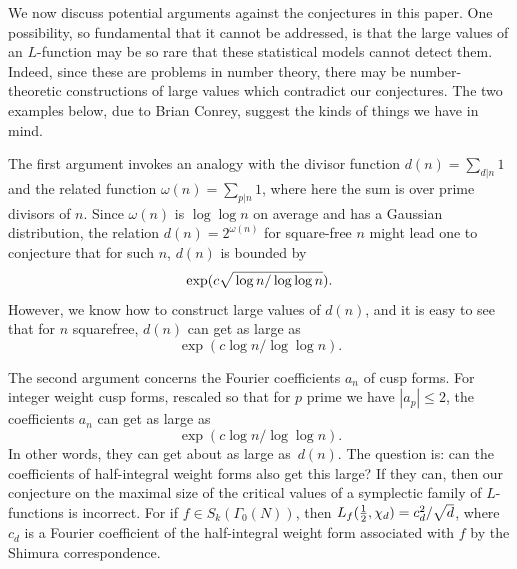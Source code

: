 \documentclass[10pt,reqno,twoside]{amsart}
\numberwithin{equation}{section}
\numberwithin{theorem}{section}
\begin{document}
{{We now discuss  potential arguments against the conjectures
in this paper. One possibility,  so fundamental that
it cannot be addressed, is that the
large values of an $L$-function may be so rare that
these statistical models cannot detect them. Indeed, since these are
problems in number theory, there may be number-theoretic
constructions of large values which contradict our conjectures.
The two examples below,  due to Brian Conrey, suggest the kinds
of things we have in mind.


The first argument invokes an
analogy with the divisor function $d(n)=\sum_{d|n} 1$ and the
related function $\omega(n)=\sum_{p|n} 1$, where here the sum is
over  prime divisors of $n$. Since $\omega(n)$ is $\log\log n$ on average and
has a Gaussian distribution,  the relation
$d(n) = 2^{\omega(n)}$ for square-free $n$ might lead one to conjecture that
for such $n$, $d(n)$ is bounded by
\begin{equation}
\exp(c \sqrt{\mathstrut  \log n/\log\log n  } ).
\end{equation}
However,  we know how to
construct large values of $d(n)$, and it is easy to see that
for $n$ squarefree, $d(n)$ can get as large as
\begin{equation}
\exp(c \log n/\log\log n   ).
\end{equation}

The second argument  concerns the
Fourier coefficients $a_n$ of cusp forms.  For integer weight cusp
forms, rescaled so that for $p$ prime we have $|a_p|\le 2$, the
coefficients $a_n$ can get as large as
\begin{equation}
\exp(c \log n/\log\log n   ).
\end{equation}
In other words, they can get about as large as~$d(n)$. The
question is: can the coefficients of half-integral weight forms
also get this large?  If they can, then our conjecture on the
maximal size of the critical values of a symplectic family of
$L$-functions is incorrect.  For if $f\in
S_k(\Gamma_0(N))$, then $L_f(\frac12,\chi_d) = c_d^2/\sqrt{\mathstrut d}$,
where  $c_d$ is a Fourier coefficient of the  half-integral weight
form associated with $f$ by the Shimura correspondence.


}}
\end{document}
